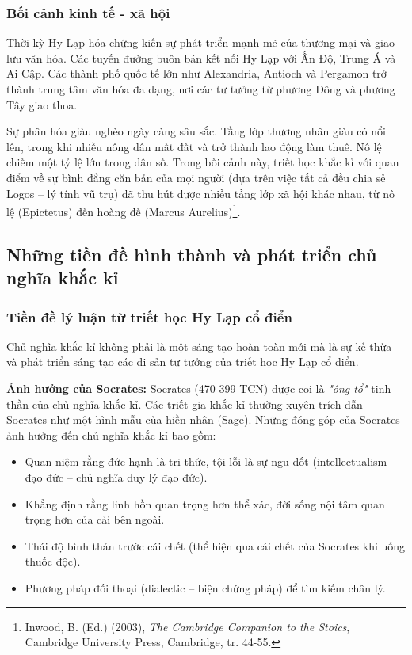 \subsubsection{Bối cảnh kinh tế - xã hội}

Thời kỳ Hy Lạp hóa chứng kiến sự phát triển mạnh mẽ của thương mại và giao lưu văn hóa. Các tuyến đường buôn bán kết nối Hy Lạp với Ấn Độ, Trung Á và Ai Cập. Các thành phố quốc tế lớn như Alexandria, Antioch và Pergamon trở thành trung tâm văn hóa đa dạng, nơi các tư tưởng từ phương Đông và phương Tây giao thoa.

Sự phân hóa giàu nghèo ngày càng sâu sắc. Tầng lớp thương nhân giàu có nổi lên, trong khi nhiều nông dân mất đất và trở thành lao động làm thuê. Nô lệ chiếm một tỷ lệ lớn trong dân số. Trong bối cảnh này, triết học khắc kỉ với quan điểm về sự bình đẳng căn bản của mọi người (dựa trên việc tất cả đều chia sẻ Logos – lý tính vũ trụ) đã thu hút được nhiều tầng lớp xã hội khác nhau, từ nô lệ (Epictetus) đến hoàng đế (Marcus Aurelius)\footnote{Inwood, B. (Ed.) (2003), \textit{The Cambridge Companion to the Stoics}, Cambridge University Press, Cambridge, tr. 44-55.}.

\subsection{Những tiền đề hình thành và phát triển chủ nghĩa khắc kỉ}

\subsubsection{Tiền đề lý luận từ triết học Hy Lạp cổ điển}

Chủ nghĩa khắc kỉ không phải là một sáng tạo hoàn toàn mới mà là sự kế thừa và phát triển sáng tạo các di sản tư tưởng của triết học Hy Lạp cổ điển.

\textbf{Ảnh hưởng của Socrates:} Socrates (470-399 TCN) được coi là \textit{"ông tổ"} tinh thần của chủ nghĩa khắc kỉ. Các triết gia khắc kỉ thường xuyên trích dẫn Socrates như một hình mẫu của hiền nhân (Sage). Những đóng góp của Socrates ảnh hưởng đến chủ nghĩa khắc kỉ bao gồm:
\begin{itemize}[leftmargin=1.5cm]
    \item Quan niệm rằng đức hạnh là tri thức, tội lỗi là sự ngu dốt (intellectualism đạo đức – chủ nghĩa duy lý đạo đức).
    \item Khẳng định rằng linh hồn quan trọng hơn thể xác, đời sống nội tâm quan trọng hơn của cải bên ngoài.
    \item Thái độ bình thản trước cái chết (thể hiện qua cái chết của Socrates khi uống thuốc độc).
    \item Phương pháp đối thoại (dialectic – biện chứng pháp) để tìm kiếm chân lý.
\end{itemize}

